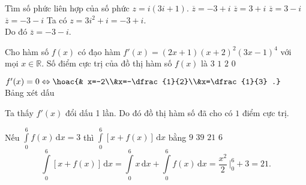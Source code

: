 \begin{ex}%
Tìm số phức liên hợp của số phức $z=i(3i+1)$.
\choice 
{$\overline{z}=-3+i$} 
{$\overline{z}=3+i$}
{$\overline{z}=3-i$} 
{\True $\overline{z}=-3-i$}
\loigiai
{
Ta có $z=3i^2+i=-3+i$.\\
Do đó $\overline{z}=-3-i$.
}
\end{ex}

\begin{ex}%
Cho hàm số $f(x)$ có đạo hàm $f'(x)=(2x+1)(x+2)^2(3x-1)^4$ với mọi $x\in\mathbb{R}$. Số điểm cực trị của đồ thị hàm số $f(x)$ là
\choice 
{$3$} 
{\True $1$}
{$2$} 
{$0$}
\loigiai
{
$f'(x)=0\Leftrightarrow \hoac{& x=-2\\&x=-\dfrac{1}{2}\\&x=\dfrac{1}{3} .}$\\
Bảng xét dấu
\begin{center}
\end{center}
Ta thấy $f'(x)$ đổi dấu 1 lần. Do đó đồ thị hàm số đã cho có $1$ điểm cực trị.
}
\end{ex}

\begin{ex}%
Nếu $\displaystyle\int\limits_{0}^{6}f(x)\mathrm{\,d}x=3$ thì $\displaystyle\int\limits_{0}^{6}\left [x+f(x) \right ]\mathrm{\,d}x$ bằng
\choice 
{$9$} 
{$39$}
{\True $21$} 
{$6$}
\loigiai
{
$$\displaystyle\int\limits_{0}^{6}\left [x+f(x) \right ]\mathrm{\,d}x=\displaystyle\int\limits_{0}^{6}x\mathrm{\,d}x+\displaystyle\int\limits_{0}^{6}f(x)\mathrm{\,d}x=\dfrac{x^2}{2}\,\Big |_{0}^{6}+3=21.$$
}
\end{ex}

